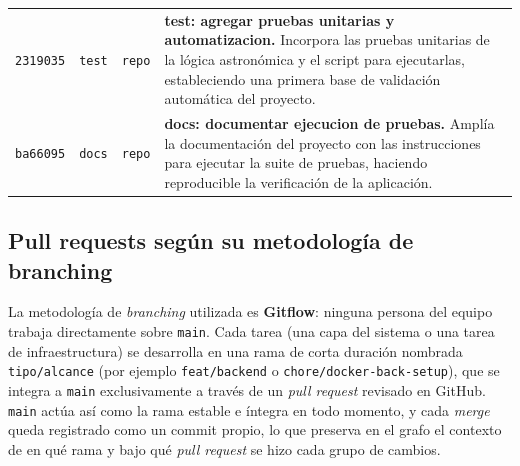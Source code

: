 \begin{center}
\begin{tabularx}{\textwidth}{@{}l l l >{\raggedright\arraybackslash}X@{}}
\texttt{2319035} &
\textcolor{gitrefactor}{\texttt{test}} &
\texttt{repo} &
\textbf{test: agregar pruebas unitarias y automatizacion.}
Incorpora las pruebas unitarias de la lógica astronómica y el script para ejecutarlas, estableciendo una primera base de validación automática del proyecto. \\
\addlinespace

\texttt{ba66095} &
\textcolor{gitdocs}{\texttt{docs}} &
\texttt{repo} &
\textbf{docs: documentar ejecucion de pruebas.}
Amplía la documentación del proyecto con las instrucciones para ejecutar la suite de pruebas, haciendo reproducible la verificación de la aplicación. \\

\bottomrule
\end{tabularx}
\end{center}



\subsection{Pull requests según su metodología de branching}

La metodología de \emph{branching} utilizada es \textbf{Gitflow}: ninguna persona del equipo trabaja directamente sobre \texttt{main}. Cada tarea (una capa del sistema o una tarea de infraestructura) se desarrolla en una rama de corta duración nombrada \texttt{tipo/alcance} (por ejemplo \texttt{feat/backend} o \texttt{chore/docker-back-setup}), que se integra a \texttt{main} exclusivamente a través de un \emph{pull request} revisado en GitHub. \texttt{main} actúa así como la rama estable e íntegra en todo momento, y cada \emph{merge} queda registrado como un commit propio, lo que preserva en el grafo el contexto de en qué rama y bajo qué \emph{pull request} se hizo cada grupo de cambios.

